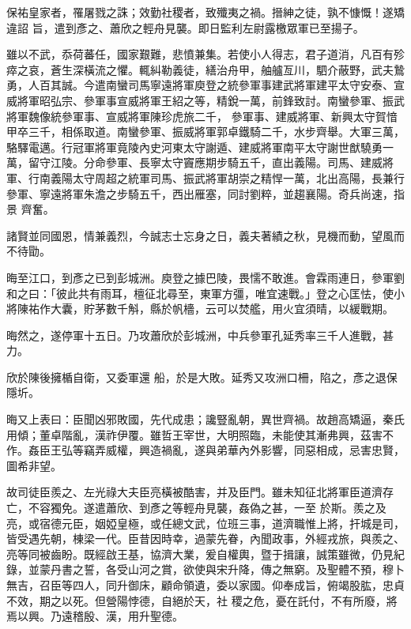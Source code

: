 \begin{pinyinscope}
 保祐皇家者，罹屠戮之誅；效勤社稷者，致殲夷之禍。搢紳之徒，孰不慷慨！遂矯違詔
 旨，遣到彥之、蕭欣之輕舟見襲。即日監利左尉露檄眾軍已至揚子。



 雖以不武，忝荷蕃任，國家艱難，悲憤兼集。若使小人得志，君子道消，凡百有殄瘁之哀，蒼生深橫流之懼。輒糾勒義徒，繕治舟甲，舳艫亙川，駟介蔽野，武夫鷙勇，人百其誠。今遣南蠻司馬寧遠將軍庾登之統參軍事建武將軍建平太守安泰、宣威將軍昭弘宗、參軍事宣威將軍王紹之等，精銳一萬，前鋒致討。南蠻參軍、振武將軍魏像統參軍事、宣威將軍陳珍虎旅二千，
 參軍事、建威將軍、新興太守賀愔甲卒三千，相係取道。南蠻參軍、振威將軍郭卓鐵騎二千，水步齊舉。大軍三萬，駱驛電邁。行冠軍將軍竟陵內史河東太守謝遁、建威將軍南平太守謝世猷驍勇一萬，留守江陵。分命參軍、長寧太守竇應期步騎五千，直出義陽。司馬、建威將軍、行南義陽太守周超之統軍司馬、振武將軍胡崇之精悍一萬，北出高陽，長兼行參軍、寧遠將軍朱澹之步騎五千，西出雁塞，同討劉粹，並趨襄陽。奇兵尚速，指景
 齊奮。



 諸賢並同國恩，情兼義烈，今誠志士忘身之日，義夫著績之秋，見機而動，望風而不待勖。



 晦至江口，到彥之已到彭城洲。庾登之據巴陵，畏懦不敢進。會霖雨連日，參軍劉和之曰：「彼此共有雨耳，檀征北尋至，東軍方彊，唯宜速戰。」登之心匡怯，使小將陳祐作大囊，貯茅數千斛，縣於帆檣，云可以焚艦，用火宜須晴，以緩戰期。



 晦然之，遂停軍十五日。乃攻蕭欣於彭城洲，中兵參軍孔延秀率三千人進戰，甚力。



 欣於陳後擁楯自衛，又委軍還
 船，於是大敗。延秀又攻洲口柵，陷之，彥之退保隱圻。



 晦又上表曰：臣聞凶邪敗國，先代成患；讒豎亂朝，異世齊禍。故趙高矯逼，秦氏用傾；董卓階亂，漢祚伊覆。雖哲王宰世，大明照臨，未能使其漸弗興，茲害不作。姦臣王弘等竊弄威權，興造禍亂，遂與弟華內外影響，同惡相成，忌害忠賢，圖希非望。



 故司徒臣羨之、左光祿大夫臣亮橫被酷害，并及臣門。雖未知征北將軍臣道濟存亡，不容獨免。遂遣蕭欣、到彥之等輕舟見襲，姦偽之甚，一至
 於斯。羨之及亮，或宿德元臣，姻婭皇極，或任總文武，位班三事，道濟職惟上將，扞城是司，皆受遇先朝，棟梁一代。臣昔因時幸，過蒙先眷，內聞政事，外經戎旅，與羨之、亮等同被齒盼。既經啟王基，協濟大業，爰自權輿，暨于揖讓，誠策雖微，仍見紀錄，並蒙丹書之誓，各受山河之賞，欲使與宋升降，傳之無窮。及聖體不預，穆卜無吉，召臣等四人，同升御床，顧命領遺，委以家國。仰奉成旨，俯竭股肱，忠貞不效，期之以死。但營陽悖德，自絕於天，社
 稷之危，憂在託付，不有所廢，將焉以興。乃遠稽殷、漢，用升聖德。




\end{pinyinscope}
